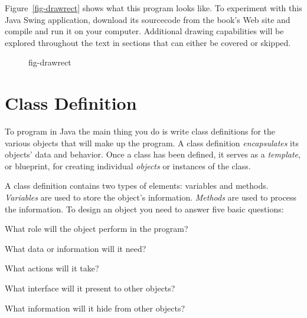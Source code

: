 Figure~\ref{fig-drawrect} shows what this program looks like.  
To experiment with this Java Swing application, download its sourcecode
from the book's Web site and compile
and run it on your computer. Additional drawing capabilities will
be explored throughout the text in sections that can either be covered
or skipped.

\begin{figure}[!bht]
\figaleftscaled{chptr02/drawrect.png}{0.8}{This is how the {\tt HelloWorldGraphic}
program will look when run.
} {fig-drawrect}

\end{figure}

\section{Class Definition}
\label{sec-classdef}

\noindent To program in Java the main thing you do is write class definitions
for the various objects that will make up the program.  A class
definition {\it encapsulates} its objects' data and behavior.  Once a
class has been defined, it serves as a {\it template}, or blueprint,
for creating individual {\it objects} or instances of the class.

A class definition contains two types of elements: variables and
methods.  {\it Variables} are used to store the
object's information.  {\it Methods} are used to process the
information.  To design an object you need to answer five basic
questions:

\begin{minipage}[t]{26pc}
\begin{NL}
\item  What role will the object perform in the program?
\item  What data or information will it need?
\item  What actions will it take?
\item  What interface will it present to other objects?
\item  What information will it hide from other objects?
\end{NL}
\end{minipage}

